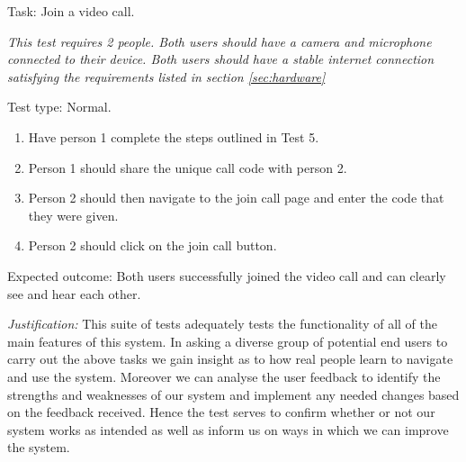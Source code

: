 {\sffamily Task:} Join a video call.\\ \vspace{0.2cm}

\textit{This test requires 2 people. Both users should have a camera 
and microphone connected to their device. Both users should have a 
stable internet connection satisfying the requirements listed in section \ref{sec:hardware}}\\

{\color{gray} \hrulefill}

{\sffamily Test type: Normal.}\\

\begin{enumerate}
  \item Have person 1 complete the steps outlined in Test 5.
  \item Person 1 should share the unique call code with person 2.
  \item Person 2 should then navigate to the join call page and enter the code that they were given.
  \item Person 2 should click on the join call button.
\end{enumerate}

{\sffamily Expected outcome:} Both users successfully joined the video call
and can clearly see and hear each other.\\

{\color{gray} \hrulefill} \vspace{0.2cm}

\textit{Justification:} This suite of tests adequately tests the
functionality of all of the main features of this system. In asking a 
diverse group of potential end users to carry out the above tasks 
we gain insight as to how real people learn to navigate and use
the system. Moreover we can analyse the user feedback to identify the
strengths and weaknesses of our system and implement any needed changes
based on the feedback received. Hence the test serves to confirm whether 
or not our system works as intended as well as inform us on ways in which
we can improve the system.
